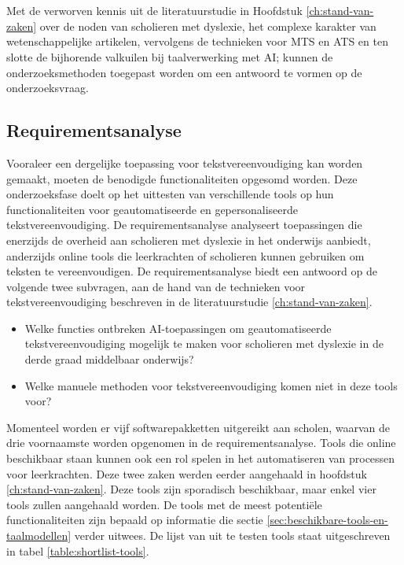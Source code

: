 
\chapter{}%
\label{ch:methodologie}

Met de verworven kennis uit de literatuurstudie in Hoofdstuk \ref{ch:stand-van-zaken} over de noden van scholieren met dyslexie, het complexe karakter van wetenschappelijke artikelen, vervolgens de technieken voor MTS en ATS en ten slotte de bijhorende valkuilen bij taalverwerking met AI; kunnen de onderzoeksmethoden toegepast worden om een antwoord te vormen op de onderzoeksvraag.

\section{Requirementsanalyse}
\label{sec:requirementsanalyse}

Vooraleer een dergelijke toepassing voor tekstvereenvoudiging kan worden gemaakt, moeten de benodigde functionaliteiten opgesomd worden. Deze onderzoeksfase doelt op het uittesten van verschillende tools op hun functionaliteiten voor geautomatiseerde en gepersonaliseerde tekstvereenvoudiging. De requirementsanalyse analyseert toepassingen die enerzijds de overheid aan scholieren met dyslexie in het onderwijs aanbiedt, anderzijds online tools die leerkrachten of scholieren kunnen gebruiken om teksten te vereenvoudigen. De requirementsanalyse biedt een antwoord op de volgende twee subvragen, aan de hand van de technieken voor tekstvereenvoudiging beschreven in de literatuurstudie \ref{ch:stand-van-zaken}. 

\begin{itemize}
	\item Welke functies ontbreken AI-toepassingen om geautomatiseerde tekstvereenvoudiging mogelijk te maken voor scholieren met dyslexie in de derde graad middelbaar onderwijs?
	\item Welke manuele methoden voor tekstvereenvoudiging komen niet in deze tools voor?
\end{itemize}

Momenteel worden er vijf softwarepakketten uitgereikt aan scholen, waarvan de drie voornaamste worden opgenomen in de requirementsanalyse. Tools die online beschikbaar staan kunnen ook een rol spelen in het automatiseren van processen voor leerkrachten. Deze twee zaken werden eerder aangehaald in hoofdstuk \ref{ch:stand-van-zaken}. Deze tools zijn sporadisch beschikbaar, maar enkel vier tools zullen aangehaald worden. De tools met de meest potentiële functionaliteiten zijn bepaald op informatie die sectie \ref{sec:beschikbare-tools-en-taalmodellen} verder uitwees. De lijst van uit te testen tools staat uitgeschreven in tabel \ref{table:shortlist-tools}.

